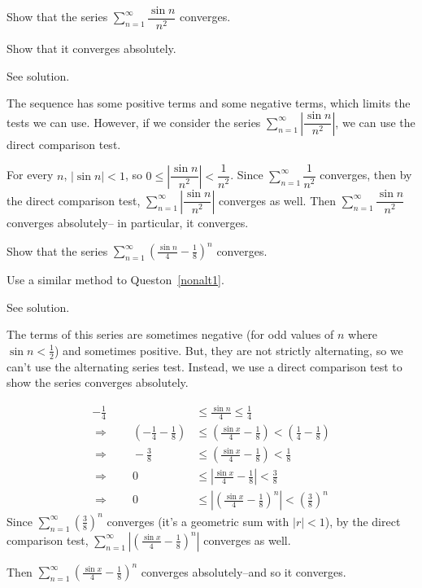 \begin{question}\label{nonalt1}
Show that the series
$\displaystyle\sum_{n=1}^\infty \dfrac{\sin n}{n^2}$ converges.
\end{question}
\begin{hint}
Show that it converges absolutely.
\end{hint}
\begin{answer}
See solution.
\end{answer}
\begin{solution}
The sequence has some positive terms and some negative terms, which limits the tests we can use. However, if we consider the series $\displaystyle\sum_{n=1}^\infty \left|\dfrac{\sin n}{n^2}\right|$, we can use the direct comparison test.

For every $n$, $| \sin n| <1$, so $0\le \left|\dfrac{\sin n}{n^2}\right|<\dfrac{1}{n^2}$. Since
$\displaystyle\sum_{n=1}^\infty \dfrac{1}{n^2}$ converges, then by the direct comparison test, $\displaystyle\sum_{n=1}^\infty \left|\dfrac{\sin n}{n^2}\right|$ converges as well. Then $\displaystyle\sum_{n=1}^\infty \dfrac{\sin n}{n^2}$ converges absolutely-- in particular, it converges.
\end{solution}
\begin{question}
Show that the series
$\displaystyle\sum_{n=1}^\infty\left(\frac{\sin n}{4}-\frac{1}{8}\right)^n$ converges.
\end{question}
\begin{hint}
Use a similar method to Queston~\ref{nonalt1}.
\end{hint}
\begin{answer}
See solution.
\end{answer}
\begin{solution}
The terms of this series are sometimes negative (for odd values of $n$ where  $\sin n <\frac{1}{2}$) and sometimes positive. But, they are not strictly alternating, so we can't use the alternating series test. Instead, we use a direct comparison test to show the series converges absolutely.

\begin{align*}
-\frac14&\le \frac{\sin n}{4} \le \frac14\\
\Rightarrow \qquad\left(-\frac{1}{4}-\frac{1}{8}\right)&\le\left( \frac{\sin x}{4} -\frac18\right)< \left(\frac14-\frac18\right)\\
\Rightarrow \qquad -\frac{3}{8} &\le\left( \frac{\sin x}{4} -\frac18\right)< \frac{1}{8}\\
\Rightarrow \qquad 0 &\le\left| \frac{\sin x}{4} -\frac18\right|< \frac{3}{8}\\
\Rightarrow \qquad 0 &\le\left|\left( \frac{\sin x}{4} -\frac18\right)^n\right|< \left(\frac{3}{8}\right)^n
\end{align*}
Since $\displaystyle\sum_{n=1}^{\infty} \left(\frac{3}{8}\right)^n$ converges (it's a geometric sum with $|r|<1$), by the direct comparison test,
$\displaystyle\sum_{n=1}^{\infty} \left|\left( \frac{\sin x}{4} -\frac18\right)^n\right|$
converges as well.

Then $\displaystyle\sum_{n=1}^{\infty} \left( \frac{\sin x}{4} -\frac18\right)^n$ converges absolutely--and so it converges.
\end{solution}
